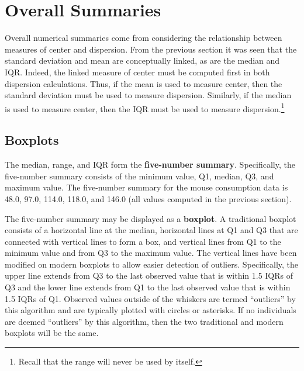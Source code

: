 \documentclass[10pt,openany]{book}\usepackage[]{graphicx}\usepackage[]{color}
\begin{document}
\section{Overall Summaries}
Overall numerical summaries come from considering the relationship between measures of center and dispersion.  From the previous section it was seen that the standard deviation and mean are conceptually linked, as are the median and IQR.  Indeed, the linked measure of center must be computed first in both dispersion calculations.  Thus, if the mean is used to measure center, then the standard deviation must be used to measure dispersion.  Similarly, if the median is used to measure center, then the IQR must be used to measure dispersion.\footnote{Recall that the range will never be used by itself.}

\subsection{Boxplots}
The median, range, and IQR form the \textbf{five-number summary}.  Specifically, the five-number summary consists of the minimum value, Q1, median, Q3, and maximum value.  The five-number summary for the mouse consumption data is 48.0, 97.0, 114.0, 118.0, and 146.0 (all values computed in the previous section).

The five-number summary may be displayed as a \textbf{boxplot}.  A traditional boxplot  consists of a horizontal line at the median, horizontal lines at Q1 and Q3 that are connected with vertical lines to form a box, and vertical lines from Q1 to the minimum value and from Q3 to the maximum value.  The vertical lines have been modified on modern boxplots to allow easier detection of outliers. Specifically, the upper line extends from Q3 to the last observed value that is within 1.5 IQRs of Q3 and the lower line extends from Q1 to the last observed value that is within 1.5 IQRs of Q1.  Observed values outside of the whiskers are termed ``outliers'' by this algorithm and are typically plotted with circles or asterisks.  If no individuals are deemed ``outliers'' by this algorithm, then the two traditional and modern boxplots will be the same.
\end{document}

